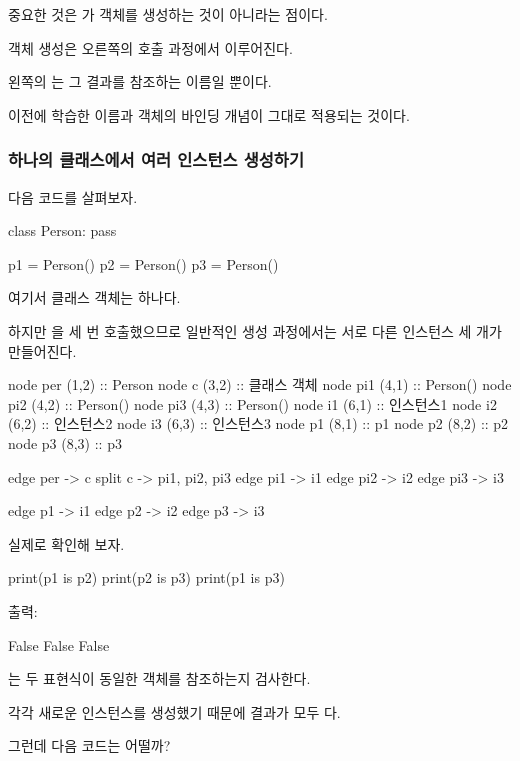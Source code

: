 중요한 것은 가 객체를 생성하는 것이 아니라는 점이다.

객체 생성은 오른쪽의  호출 과정에서 이루어진다.

왼쪽의 는 그 결과를 참조하는 이름일 뿐이다.

이전에 학습한 이름과 객체의 바인딩 개념이 그대로 적용되는 것이다.

\subsubsection{하나의 클래스에서 여러 인스턴스 생성하기}

다음 코드를 살펴보자.

\begin{dhkcode}
class Person:
    pass

p1 = Person()
p2 = Person()
p3 = Person()
\end{dhkcode}

여기서  클래스 객체는 하나다.

하지만 을 세 번 호출했으므로 일반적인 생성 과정에서는 서로 다른 인스턴스 세 개가 만들어진다.

\begin{dhkdiagram}[in=6]
node per (1,2) :: Person
node c (3,2) :: 클래스 객체
node pi1 (4,1) :: Person()
node pi2 (4,2) :: Person()
node pi3 (4,3) :: Person()
node i1 (6,1) :: 인스턴스1
node i2 (6,2) :: 인스턴스2
node i3 (6,3) :: 인스턴스3
node p1 (8,1) :: p1
node p2 (8,2) :: p2
node p3 (8,3) :: p3

edge per -> c
split c -> pi1, pi2, pi3
edge pi1 -> i1
edge pi2 -> i2
edge pi3 -> i3

edge p1 -> i1
edge p2 -> i2
edge p3 -> i3
\end{dhkdiagram}

실제로 확인해 보자.

\begin{dhkcode}
print(p1 is p2)
print(p2 is p3)
print(p1 is p3)
\end{dhkcode}

출력:

\begin{dhkzsh}
False
False
False
\end{dhkzsh}

는 두 표현식이 동일한 객체를 참조하는지 검사한다.

각각 새로운 인스턴스를 생성했기 때문에 결과가 모두 다.

그런데 다음 코드는 어떨까?

